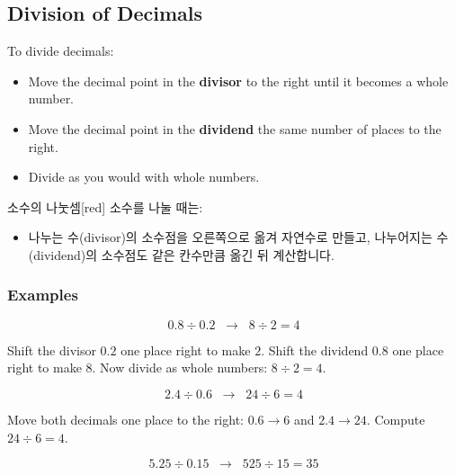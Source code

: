 \documentclass[12pt]{book}
\begin{document}
  \twosidedpaper
  \subsection{Division of Decimals}
  
  To divide decimals:
  \begin{itemize}
    \item Move the decimal point in the \textbf{divisor} to the right until it becomes a whole number.  
    \item Move the decimal point in the \textbf{dividend} the same number of places to the right.  
    \item Divide as you would with whole numbers.  
  \end{itemize}
  
  \begin{flexbox}{소수의 나눗셈}[red]
  소수를 나눌 때는:  
  \begin{itemize}
    \item 나누는 수(divisor)의 소수점을 오른쪽으로 옮겨 자연수로 만들고,  
          나누어지는 수(dividend)의 소수점도 같은 칸수만큼 옮긴 뒤 계산합니다.  
  \end{itemize}
  \end{flexbox}
  
  \subsubsection*{Examples}
  
  \[
  0.8 \div 0.2 \;\;\rightarrow\;\; 8 \div 2 = 4
  \]
  
  Shift the divisor $0.2$ one place right to make $2$.  
  Shift the dividend $0.8$ one place right to make $8$.  
  Now divide as whole numbers: $8\div2=4$.
  
  
  
  
  \[
  2.4 \div 0.6 \;\;\rightarrow\;\; 24 \div 6 = 4
  \]
  
  Move both decimals one place to the right: $0.6 \to 6$ and $2.4 \to 24$.  
  Compute $24\div6=4$.
  
  
  
  
  \[
  5.25 \div 0.15 \;\;\rightarrow\;\; 525 \div 15 = 35
  \]
  
\end{document}
